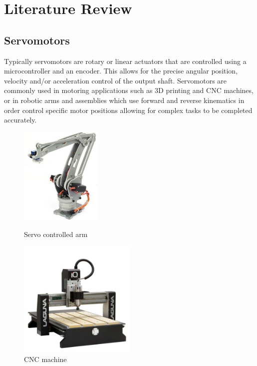 \chapter{Literature Review}

\vspace{-15mm}
\section{Servomotors}
\vspace{-5mm}
Typically servomotors are rotary or linear actuators that are controlled using a microcontroller and an encoder. This allows for the precise angular position, velocity and/or acceleration control of the output shaft. Servomotors are commonly used in motoring applications such as 3D printing and CNC machines, or in robotic arms and assemblies which use forward and reverse kinematics in order control specific motor positions allowing for complex tasks to be completed accurately\cite{servo}.
\vspace{-5mm}
\begin{figure}[H]
  \centering
  \begin{minipage}[b]{0.45\textwidth}
  \centering
    \includegraphics[width=0.35\textwidth]{servo_arm.jpg}
    \caption{Servo controlled arm  \cite{servo_arm}}
  \end{minipage}
  \hfill
  \begin{minipage}[b]{0.45\textwidth}
    \centering
    \includegraphics[width=0.5\textwidth]{cnc.jpg}
    \caption{CNC machine \cite{cnc}}
  \end{minipage}
\end{figure}
